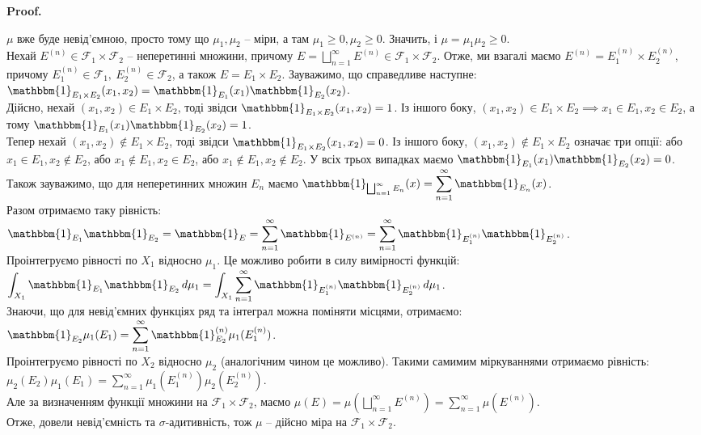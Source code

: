 \documentclass[a4paper, 10pt]{article}
\makeatletter
\theoremstyle{theoremdd}
\renewenvironment{proof}[1][Proof.\\]{\par
\pushQED{\hfill \qed}%
\normalfont \topsep6\p@\@plus6\p@\relax
\trivlist
\item\relax
{\bfseries
#1\@addpunct{.}}\hspace\labelsep\ignorespaces
}{%
\popQED\endtrivlist\@endpefalse
}
\makeatother
\begin{document}
\begin{proof}
$\mu$ вже буде невід'ємною, просто тому що $\mu_1,\mu_2$ -- міри, а там $\mu_1 \geq 0, \mu_2 \geq 0$. Значить, і $\mu = \mu_1 \mu_2 \geq 0$.\\
Нехай $E^{(n)} \in \mathcal{F}_1 \times \mathcal{F}_2$ -- неперетинні множини, причому $E =\displaystyle\bigsqcup_{n=1}^\infty E^{(n)} \in \mathcal{F}_1 \times \mathcal{F}_2$. Отже, ми взагалі маємо $E^{(n)} = E^{(n)}_1 \times E^{(n)}_2$, причому $E^{(n)}_1 \in \mathcal{F}_1,\ E^{(n)}_2 \in \mathcal{F}_2$, а також $E = E_1 \times E_2$. Зауважимо, що справедливе наступне:\\
$\mathbbm{1}_{E_1 \times E_2}(x_1,x_2) = \mathbbm{1}_{E_1}(x_1) \mathbbm{1}_{E_2}(x_2)$.\\
Дійсно, нехай $(x_1,x_2) \in E_1 \times E_2$, тоді звідси $\mathbbm{1}_{E_1 \times E_2}(x_1,x_2) = 1$. Із іншого боку, $(x_1,x_2) \in E_1 \times E_2 \implies x_1 \in E_1, x_2 \in E_2$, а тому $\mathbbm{1}_{E_1}(x_1) \mathbbm{1}_{E_2}(x_2) = 1$.\\
Тепер нехай $(x_1,x_2) \notin E_1 \times E_2$, тоді звідси $\mathbbm{1}_{E_1 \times E_2}(x_1,x_2) = 0$. Із іншого боку, $(x_1,x_2) \notin E_1 \times E_2$ означає три опції: або $x_1 \in E_1, x_2 \notin E_2$, або $x_1 \notin E_1, x_2 \in E_2$, або $x_1 \notin E_1, x_2 \notin E_2$. У всіх трьох випадках маємо $\mathbbm{1}_{E_1}(x_1) \mathbbm{1}_{E_2}(x_2) = 0$.\\
Також зауважимо, що для неперетинних множин $E_n$ маємо $\displaystyle\mathbbm{1}_{\bigsqcup_{n=1}^\infty E_n}(x) = \sum_{n=1}^\infty \mathbbm{1}_{E_n}(x)$.\\
Разом отримаємо таку рівність:\\
$\displaystyle\mathbbm{1}_{E_1} \mathbbm{1}_{E_2} = \mathbbm{1}_{E} = \sum_{n=1}^\infty \mathbbm{1}_{E^{(n)}} = \sum_{n=1}^\infty \mathbbm{1}_{E_1^{(n)}} \mathbbm{1}_{E_2^{(n)}}$.\\
Проінтегруємо рівності по $X_1$ відносно $\mu_1$. Це можливо робити в силу вимірності функцій:\\
$\displaystyle\int_{X_1} \mathbbm{1}_{E_1} \mathbbm{1}_{E_2}\,d\mu_1 = \int_{X_1}\sum_{n=1}^\infty \mathbbm{1}_{E_1^{(n)}} \mathbbm{1}_{E_2^{(n)}}\,d\mu_1$.\\
Знаючи, що для невід'ємних функціях ряд та інтеграл можна поміняти місцями, отримаємо:\\
$\displaystyle\mathbbm{1}_{E_2} \mu_1(E_1) = \sum_{n=1}^\infty \mathbbm{1}_{E_2}^{(n)} \mu_1(E_1^{(n)})$.\\
Проінтегруємо рівності по $X_2$ відносно $\mu_2$ (аналогічним чином це можливо). Такими самимим міркуваннями отримаємо рівність:\\
$\mu_2(E_2) \mu_1(E_1) = \displaystyle\sum_{n=1}^\infty \mu_1(E_1^{(n)}) \mu_2(E_2^{(n)})$.\\
Але за визначенням функції множини на $\mathcal{F}_1 \times \mathcal{F}_2$, маємо $\displaystyle\mu(E) = \mu\left( \bigsqcup_{n=1}^\infty E^{(n)} \right) =\sum_{n=1}^\infty \mu(E^{(n)})$.\\
Отже, довели невід'ємність та $\sigma$-адитивність, тож $\mu$ -- дійсно міра на $\mathcal{F}_1 \times \mathcal{F}_2$.
\end{proof}
\end{document}
